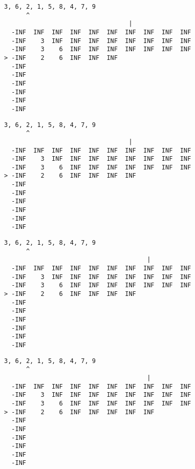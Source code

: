 { \begin{verbatim}
3, 6, 2, 1, 5, 8, 4, 7, 9
      ^
                                  |
  -INF  INF  INF  INF  INF  INF  INF  INF  INF  INF
  -INF    3  INF  INF  INF  INF  INF  INF  INF  INF
  -INF    3    6  INF  INF  INF  INF  INF  INF  INF
> -INF    2    6  INF  INF  INF                    
  -INF                                             
  -INF                                             
  -INF                                             
  -INF                                             
  -INF                                             
  -INF                                             
\end{verbatim} }

{ \begin{verbatim}
3, 6, 2, 1, 5, 8, 4, 7, 9
      ^
                                  |
  -INF  INF  INF  INF  INF  INF  INF  INF  INF  INF
  -INF    3  INF  INF  INF  INF  INF  INF  INF  INF
  -INF    3    6  INF  INF  INF  INF  INF  INF  INF
> -INF    2    6  INF  INF  INF  INF               
  -INF                                             
  -INF                                             
  -INF                                             
  -INF                                             
  -INF                                             
  -INF                                             
\end{verbatim} }

{ \begin{verbatim}
3, 6, 2, 1, 5, 8, 4, 7, 9
      ^
                                       |
  -INF  INF  INF  INF  INF  INF  INF  INF  INF  INF
  -INF    3  INF  INF  INF  INF  INF  INF  INF  INF
  -INF    3    6  INF  INF  INF  INF  INF  INF  INF
> -INF    2    6  INF  INF  INF  INF               
  -INF                                             
  -INF                                             
  -INF                                             
  -INF                                             
  -INF                                             
  -INF                                             
\end{verbatim} }

{ \begin{verbatim}
3, 6, 2, 1, 5, 8, 4, 7, 9
      ^
                                       |
  -INF  INF  INF  INF  INF  INF  INF  INF  INF  INF
  -INF    3  INF  INF  INF  INF  INF  INF  INF  INF
  -INF    3    6  INF  INF  INF  INF  INF  INF  INF
> -INF    2    6  INF  INF  INF  INF  INF          
  -INF                                             
  -INF                                             
  -INF                                             
  -INF                                             
  -INF                                             
  -INF                                             
\end{verbatim} }

